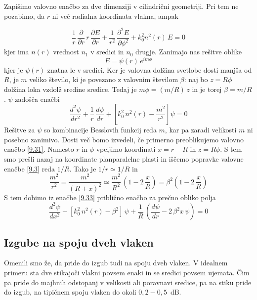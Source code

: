 Zapišimo valovno enačbo za dve dimenziji v cilindrični
geometriji. Pri tem ne pozabimo, da $r$ ni več radialna koordinata vlakna, ampak

\begin{equation}
\frac{1}{r}\,\frac{\partial}{\partial r}\, r\,\frac{\partial E}{\partial r}+\frac{1}{r^{2}}\,\frac{\partial^{2}E}{\partial\phi^{2}}+k_{0}^{2}n^{2}\left(r\right)\, E=0\label{9.31}
\end{equation}
 kjer ima $n\left(r\right)$ vrednost $n_{1}$ v sredici in $n_{0}$
drugje. Zanimajo nas rešitve oblike 
\begin{equation}
E=\psi\left(r\right)\, e^{im\phi}\label{9.32}
\end{equation}
 kjer je $\psi\left(r\right)$ znatna le v sredici. Ker je valovna
dolžina svetlobe dosti manjša od $R$, je $m$ veliko število, ki
je povezano z valovnim številom $\beta$: naj bo $z=R\phi$ dolžina
loka vzdolž sredine sredice. Tedaj je $m\phi=(m/R)\, z$ in je torej
$\beta=m/R$. $\psi$ zadošča enačbi 
\begin{equation}
\frac{d^{2}\psi}{dr^{2}}+\frac{1}{r}\,\frac{d\psi}{dr}+\left[k_{0}^{2}\, n^{2}\left(r\right)-\frac{m^{2}}{r^{2}}\right]\psi=0\label{9.33}
\end{equation}
 Rešitve za $\psi$ so kombinacije Besslovih funkcij reda $m$, kar
pa zaradi velikosti $m$ ni posebno zanimivo. Dosti več bomo izvedeli,
če primerno preoblikujemo valovno enačbo \ref{9.31}. Namesto $r$
in $\phi$ vpeljimo koordinati $x=r-R$ in $z=R\phi$. S tem smo prešli
nazaj na koordinate planparalelne plasti in iščemo popravke valovne
enačbe \ref{9.3} reda $1/R.$ Tako je $1/r\simeq1/R$ in 
\begin{equation}
\frac{m^{2}}{r^{2}}=\frac{m^{2}}{\left(R+x\right)^{2}}\simeq\frac{m^{2}}{R^{2}}\,\left(1-2\,\frac{x}{R}\right)=\beta^{2}\left(1-2\,\frac{x}{R}\right)\label{9.34}
\end{equation}
 S tem dobimo iz enačbe \ref{9.33} približno enačbo za prečno obliko
polja 
\begin{equation}
\frac{d^{2}\psi}{dx^{2}}+\left[k_{0}^{2}\, n^{2}\left(r\right)-\beta^{2}\right]\,\psi+\frac{1}{R}\,\left(\frac{d\psi}{dr}-2\,\beta^{2}x\,\psi\right)=0\label{9.35}
\end{equation}

\subsection*{Izgube na spoju dveh vlaken}
Omenili smo že, da pride do izgub tudi na spoju dveh vlaken. 
V idealnem primeru sta dve stikajoči vlakni povsem enaki in se sredici povsem ujemata. 
Čim pa pride do majhnih odstopanj v velikosti ali poravnavi sredice, pa na stiku pride 
do izgub, na tipičnem spoju vlaken do okoli $0,2-0,5$~dB.

